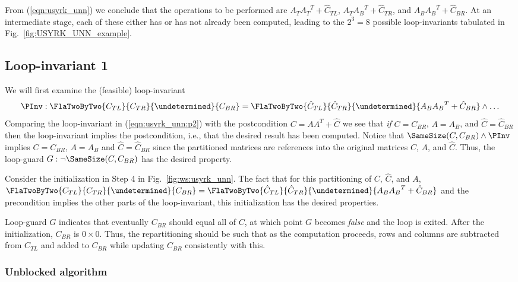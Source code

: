 From (\ref{eqn:usyrk_unn}) we conclude that the operations to be
performed are $ A_T {A_T}^T + \hat{C}_{TL} $, $ A_T {A_B}^T + \hat{C}_{TR} $, and $ A_B {A_B}^T + 
\hat{C}_{BR} $.  At an intermediate stage, each of these either has or
has not already been computed, leading to the $ 2^3 = 8 $ possible
loop-invariants tabulated in Fig.~\ref{fig:USYRK_UNN_example}.

\subsection{Loop-invariant 1}

We will first examine the (feasible) loop-invariant
\begin{equation}
\label{eqn:usyrk_unn:p2}
\PInv: \FlaTwoByTwo{ C_{TL} } { C_{TR} }
            { \undetermined}  { C_{BR} }
 =
\FlaTwoByTwo{ \hat{C}_{TL} }  { \hat{C}_{TR} }
            { \undetermined } { A_B {A_B}^T + \hat{C}_{BR} }
\wedge
\ldots
\end{equation}
Comparing the loop-invariant in (\ref{eqn:usyrk_unn:p2}) with the
postcondition $ C = A A^T +  \hat{C} $ we see that {\em if} $C=C_{BR}$, $ A =
A_B $, and $ \hat{C} = \hat{C}_{BR} $ then the loop-invariant implies the
postcondition, i.e., that the desired result has been computed.
Notice that $ \SameSize( C, C_{BR} ) \wedge \PInv $ implies $ C =
C_{BR} $, $ A = A_B $ and $ \hat{C}=\hat{C}_{BR} $ since the partitioned
matrices are references into the original matrices $ C $, $ A $, and $
\hat{C} $.  Thus, the loop-guard $ G: \neg \SameSize( C, C_{BR} ) $
has the desired property.

Consider the initialization in Step 4 in Fig.~\ref{fig:ws:usyrk_unn}.
The fact that for this partitioning of $ C $, $ \hat{C} $, and $ A $,
$
\FlaTwoByTwo{ C_{TL} }       { C_{TR} }
            { \undetermined} { C_{BR} }
=
\FlaTwoByTwo{ \hat{C}_{TL} }  { \hat{C}_{TR} }
            { \undetermined } { A_B {A_B}^T + \hat{C}_{BR} }
$ and the precondition implies the
other parts of the loop-invariant, this initialization has the desired
properties.

Loop-guard $ G $ indicates that eventually $ C_{BR} $ should equal all
of $ C $, at which point $ G $ becomes {\em false} and the loop is
exited.  After the initialization, $ C_{BR} $ is $ 0 \times 0 $.
Thus, the repartitioning should be such that as the computation
proceeds, rows and columns are subtracted from $ C_{TL} $ and added to
$ C_{BR} $ while updating $ C_{BR} $ consistently with this.

\subsubsection{Unblocked algorithm}

